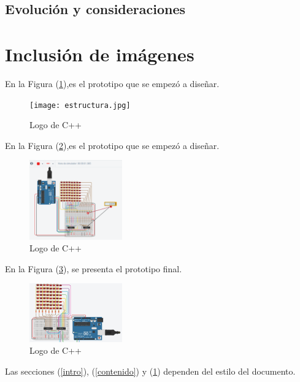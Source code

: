 \documentclass{article}
\begin{document}
\subsection{Evolución y consideraciones}

\section{Inclusión de imágenes} \label{imagenes}

En la Figura (\ref{fig:estructura}),es el prototipo que se empezó a diseñar.

\begin{figure}[h]
\texttt{[image: estructura.jpg]}
\centering
\caption{Logo de C++}
\label{fig:estructura}
\end{figure}

En la Figura (\ref{fig:prueba_corriente1}),es el prototipo que se empezó a diseñar.

\begin{figure}[h]
\includegraphics[width=4cm]{prueba_corriente1.png}
\centering
\caption{Logo de C++}
\label{fig:prueba_corriente1}
\end{figure}

En la Figura (\ref{fig:primer_patron}), se presenta el prototipo final.

\begin{figure}[h]
\includegraphics[width=4cm]{primer_patron.png}
\centering
\caption{Logo de C++}
\label{fig:primer_patron}
\end{figure}

Las secciones (\ref{intro}), (\ref{contenido}) y (\ref{imagenes}) dependen del estilo del documento.



\end{document}
